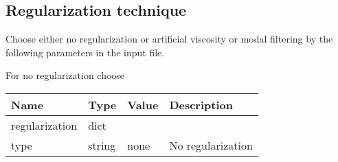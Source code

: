 \subsection{Regularization technique}
Choose either no regularization or artificial viscosity or modal filtering by the following
parameters in the input file.

For no regularization choose
\begin{longtable}{lllp{7.5cm}}
\toprule
\rowcolor{gray!50}\textbf{Name} &  \textbf{Type} & \textbf{Value}  & \textbf{Description}  \\ \midrule
regularization & dict & & \\
\qquad type  & string& none & No regularization\\
\bottomrule
\end{longtable}

